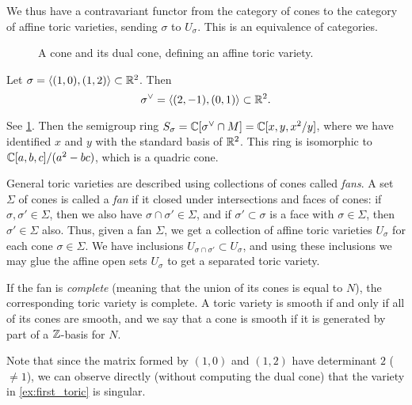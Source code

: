 We thus have a contravariant functor from the category of cones to the category of affine toric varieties, sending $\sigma$ to $U_\sigma$. This is an equivalence of categories.

\begin{example}
\label{ex:first_toric}
\begin{figure}
\centering 
\hspace*{\fill}%
\subbottom[The cone $\sigma = \langle (1,0), (1,2) \rangle$.]{

\label{fig:toric_example}
}
 \hspace*{\fill}%
 \hspace*{\fill}%
\caption{A cone and its dual cone, defining an affine toric variety.}
\label{fig:first_toric_example}
\end{figure}

Let $\sigma=\langle (1,0), (1,2) \rangle \subset \mathbb{R}^2$. Then
\[
\sigma^\vee = \langle (2,-1),(0,1) \rangle \subset \mathbb{R}^2.
\]

See \cref{fig:first_toric_example}. Then the semigroup ring $S_\sigma = \mathbb{C}[\sigma^\vee \cap M] = \mathbb{C}[x,y,x^2/y]$, where we have identified $x$ and $y$ with the standard basis of $\mathbb{R}^2$. This ring is isomorphic to $\mathbb{C}[a,b,c]/(a^2-bc)$, which is a quadric cone.
\end{example}

General toric varieties are described using collections of cones called \emph{fans}. A set $\Sigma$ of cones is called a \emph{fan} if it closed under intersections and faces of cones: if $\sigma, \sigma' \in \Sigma$, then we also have $\sigma \cap \sigma' \in \Sigma$, and if $\sigma' \subset \sigma$ is a face with $\sigma \in \Sigma$, then $\sigma' \in \Sigma$ also. Thus, given a fan $\Sigma$, we get a collection of affine toric varieties $U_\sigma$ for each cone $\sigma \in \Sigma$. We have inclusions $U_{\sigma \cap \sigma'} \subset U_\sigma$, and using these inclusions we may glue the affine open sets $U_\sigma$ to get a separated toric variety.

If the fan is \emph{complete} (meaning that the union of its cones is equal to $N$), the corresponding toric variety is complete. A toric variety is smooth if and only if all of its cones are smooth, and we say that a cone is smooth if it is generated by part of a $\mathbb{Z}$-basis for $N$.

\begin{remark}
Note that since the matrix formed by $(1,0)$ and $(1,2)$ have determinant $2$ ($\neq 1$), we can observe directly (without computing the dual cone) that the variety in \cref{ex:first_toric} is singular.
\end{remark}

